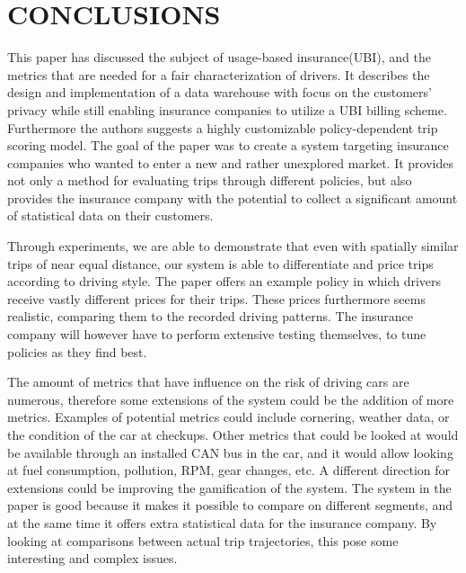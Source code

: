 \section{CONCLUSIONS}
This paper has discussed the subject of usage-based insurance(UBI), and the metrics that are needed for a fair characterization of drivers. It describes the design and implementation of a data warehouse with focus on the customers' privacy while still enabling insurance companies to utilize a UBI billing scheme. Furthermore the authors suggests a highly customizable policy-dependent trip scoring model.
The goal of the paper was to create a system targeting insurance companies who wanted to enter a new and rather unexplored market. It provides not only a method for evaluating trips through different policies, but also provides the insurance company with the potential to collect a significant amount of statistical data on their customers.

Through experiments, we are able to demonstrate that even with spatially similar trips of near equal distance, our system is able to differentiate and price trips according to driving style. The paper offers an example policy in which drivers receive vastly different prices for their trips. These prices furthermore seems realistic, comparing them to the recorded driving patterns. The insurance company will however have to perform extensive testing themselves, to tune policies as they find best. 

The amount of metrics that have influence on the risk of driving cars are numerous, therefore some extensions of the system could be the addition of more metrics. Examples of potential metrics could include cornering, weather data, or the condition of the car at checkups. Other metrics that could be looked at would be available through an installed CAN bus in the car, and it would allow looking at fuel consumption, pollution, RPM, gear changes, etc.
A different direction for extensions could be improving the gamification of the system. The system in the paper is good because it makes it possible to compare on different segments, and at the same time it offers extra statistical data for the insurance company. By looking at comparisons between actual trip trajectories, this pose some interesting and complex issues.


\addtolength{\textheight}{-12cm}   %
